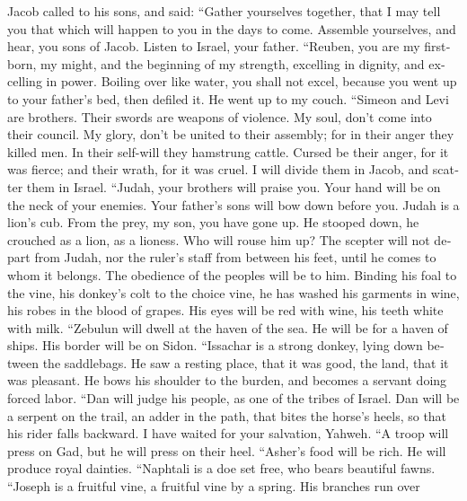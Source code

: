 \begin{paracol}{2}
\begin{otherlanguage}{english}
 Jacob called to his sons, and said: ``Gather yourselves
together, that I may tell you that which will happen to you in the days
to come.  Assemble yourselves, and hear, you sons of
Jacob. Listen to Israel, your father.  ``Reuben, you are
my firstborn, my might, and the beginning of my strength, excelling in
dignity, and excelling in power.  Boiling over like water,
you shall not excel, because you went up to your father's bed, then
defiled it. He went up to my couch.  ``Simeon and Levi are
brothers. Their swords are weapons of violence.  My soul,
don't come into their council. My glory, don't be united to their
assembly; for in their anger they killed men. In their self-will they
hamstrung cattle.  Cursed be their anger, for it was
fierce; and their wrath, for it was cruel. I will divide them in Jacob,
and scatter them in Israel.  ``Judah, your brothers will
praise you. Your hand will be on the neck of your enemies. Your father's
sons will bow down before you.  Judah is a lion's cub.
From the prey, my son, you have gone up. He stooped down, he crouched as
a lion, as a lioness. Who will rouse him up?  The scepter
will not depart from Judah, nor the ruler's staff from between his feet,
until he comes to whom it belongs. The obedience of the peoples will be
to him.  Binding his foal to the vine, his donkey's colt
to the choice vine, he has washed his garments in wine, his robes in the
blood of grapes.  His eyes will be red with wine, his
teeth white with milk.  ``Zebulun will dwell at the haven
of the sea. He will be for a haven of ships. His border will be on
Sidon.  ``Issachar is a strong donkey, lying down between
the saddlebags.  He saw a resting place, that it was
good, the land, that it was pleasant. He bows his shoulder to the
burden, and becomes a servant doing forced labor.  ``Dan
will judge his people, as one of the tribes of Israel. 
Dan will be a serpent on the trail, an adder in the path, that bites the
horse's heels, so that his rider falls backward.  I have
waited for your salvation, Yahweh.  ``A troop will press
on Gad, but he will press on their heel.  ``Asher's food
will be rich. He will produce royal dainties.  ``Naphtali
is a doe set free, who bears beautiful fawns.  ``Joseph
is a fruitful vine, a fruitful vine by a spring. His branches run over

\end{otherlanguage}
\end{paracol}
